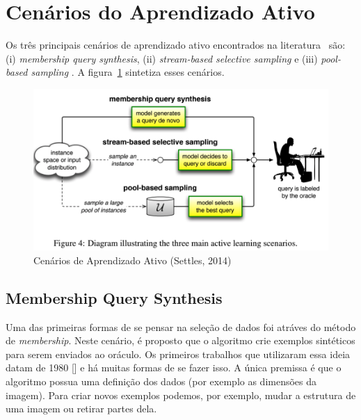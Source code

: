 

\section{Cenários do Aprendizado Ativo}
\label{sec:cenarios}

Os três principais cenários de aprendizado ativo encontrados na literatura~\citep{settles2014active} são: (i) \emph{membership query synthesis}, (ii) \emph{stream-based selective sampling} e (iii) \emph{pool-based sampling} . A figura~\ref{fig:ActiveLearningScenarios} sintetiza esses cenários.


\begin{figure}
  \centering
  \includegraphics[width=.8\textwidth]{figures/active_learning_scenarios.png}
  \caption{Cenários de Aprendizado Ativo (Settles, 2014)}
  \label{fig:ActiveLearningScenarios}
\end{figure}


\subsection{Membership Query Synthesis}
\label{sec:cenarios_membeship}

Uma das primeiras formas de se pensar na seleção de dados foi atráves do método de \emph{membership}. Neste cenário, é proposto que o algoritmo crie exemplos sintéticos para serem enviados ao oráculo. Os primeiros trabalhos que utilizaram essa ideia datam de 1980 [\cite{shapiro1981algorithm, shapiro1982algorithmic, shapiro198algorithmic_2}] e há muitas formas de se fazer isso. A única premissa é que o algoritmo possua uma definição dos dados (por exemplo as dimensões da imagem). Para criar novos exemplos podemos, por exemplo, mudar a estrutura de uma imagem ou retirar partes dela.

